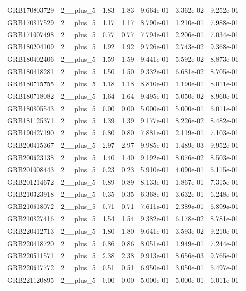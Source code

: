\documentclass[12pt]{article}
\begin{document}
\begin{table}[h!]
{\begin{tabular}{l c c c c c c}
GRB170803729 & 2__plus_5 & 1.83 & 1.83 & 9.664e-01 & 3.362e-02 & 9.252e-01 \\
GRB170817529 & 2__plus_5 & 1.17 & 1.17 & 8.790e-01 & 1.210e-01 & 7.988e-01 \\
GRB171007498 & 2__plus_5 & 0.77 & 0.77 & 7.794e-01 & 2.206e-01 & 7.034e-01 \\
GRB180204109 & 2__plus_5 & 1.92 & 1.92 & 9.726e-01 & 2.743e-02 & 9.368e-01 \\
GRB180402406 & 2__plus_5 & 1.59 & 1.59 & 9.441e-01 & 5.592e-02 & 8.873e-01 \\
GRB180418281 & 2__plus_5 & 1.50 & 1.50 & 9.332e-01 & 6.681e-02 & 8.705e-01 \\
GRB180715755 & 2__plus_5 & 1.18 & 1.18 & 8.810e-01 & 1.190e-01 & 8.011e-01 \\
GRB180718082 & 2__plus_5 & 1.64 & 1.64 & 9.495e-01 & 5.050e-02 & 8.960e-01 \\
GRB180805543 & 2__plus_5 & 0.00 & 0.00 & 5.000e-01 & 5.000e-01 & 6.011e-01 \\
GRB181125371 & 2__plus_5 & 1.39 & 1.39 & 9.177e-01 & 8.226e-02 & 8.482e-01 \\
GRB190427190 & 2__plus_5 & 0.80 & 0.80 & 7.881e-01 & 2.119e-01 & 7.103e-01 \\
GRB200415367 & 2__plus_5 & 2.97 & 2.97 & 9.985e-01 & 1.489e-03 & 9.952e-01 \\
GRB200623138 & 2__plus_5 & 1.40 & 1.40 & 9.192e-01 & 8.076e-02 & 8.503e-01 \\
GRB201008443 & 2__plus_5 & 0.23 & 0.23 & 5.910e-01 & 4.090e-01 & 6.115e-01 \\
GRB201214672 & 2__plus_5 & 0.89 & 0.89 & 8.133e-01 & 1.867e-01 & 7.315e-01 \\
GRB210323918 & 2__plus_5 & 0.35 & 0.35 & 6.368e-01 & 3.632e-01 & 6.248e-01 \\
GRB210618072 & 2__plus_5 & 0.71 & 0.71 & 7.611e-01 & 2.389e-01 & 6.899e-01 \\
GRB210827416 & 2__plus_5 & 1.54 & 1.54 & 9.382e-01 & 6.178e-02 & 8.781e-01 \\
GRB220412713 & 2__plus_5 & 1.80 & 1.80 & 9.641e-01 & 3.593e-02 & 9.210e-01 \\
GRB220418720 & 2__plus_5 & 0.86 & 0.86 & 8.051e-01 & 1.949e-01 & 7.244e-01 \\
GRB220511571 & 2__plus_5 & 2.38 & 2.38 & 9.913e-01 & 8.656e-03 & 9.765e-01 \\
GRB220617772 & 2__plus_5 & 0.51 & 0.51 & 6.950e-01 & 3.050e-01 & 6.497e-01 \\
GRB221120895 & 2__plus_5 & 0.00 & 0.00 & 5.000e-01 & 5.000e-01 & 6.011e-01 \\

\end{tabular}}
\end{table}
\end{document}
